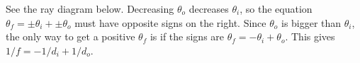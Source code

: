  See the ray diagram below. Decreasing $\theta_o$ decreases
$\theta_i$, so the equation $\theta_f=\pm\theta_i+\pm\theta_o$
must have opposite signs on the right. Since $\theta_o$ is bigger
than $\theta_i$, the only way to get a positive $\theta_f$ is if
the signs are $\theta_f=-\theta_i+\theta_o$.
This gives $1/f=-1/d_i+1/d_o$.


